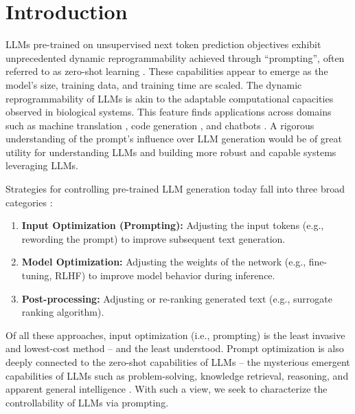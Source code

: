 \documentclass{article} %
\begin{document}
\section{Introduction}
LLMs pre-trained on unsupervised next token prediction objectives exhibit unprecedented dynamic reprogrammability achieved through ``prompting'', often referred to as zero-shot learning \citep{gpt3, wei2022emergent, hagendorff2023machine, noever2023numeracy, openai2023gpt4, GPT3_5_blog}. 
These capabilities appear to emerge as the model's size, training data, and training time are scaled.
The dynamic reprogrammability of LLMs is akin to the adaptable computational capacities observed in biological systems. 
This feature finds applications across domains such as machine translation \citep{wang2023document}, code generation \citep{code_llama}, and chatbots \cite{rlhf_chatbot}. 
A rigorous understanding of the prompt's influence over LLM generation would be of great utility for understanding LLMs and building more robust and capable systems leveraging LLMs. 


Strategies for controlling pre-trained LLM generation today fall into three broad categories \citep{survey_controllable_text_gen}: 
\begin{enumerate}
    \item \textbf{Input Optimization (Prompting): } Adjusting the input tokens (e.g., rewording the prompt) to improve subsequent text generation. 
    \item \textbf{Model Optimization: } Adjusting the weights of the network (e.g., fine-tuning, RLHF) to improve model behavior during inference. 
    \item \textbf{Post-processing: } Adjusting or re-ranking generated text (e.g., surrogate ranking algorithm). 
\end{enumerate}

Of all these approaches, input optimization (i.e., prompting) is the least invasive and lowest-cost method -- and the least understood.
Prompt optimization is also deeply connected to the zero-shot capabilities of LLMs -- the mysterious emergent capabilities of LLMs such as problem-solving, knowledge retrieval, reasoning, and apparent general intelligence \citep{bubeck2023sparks}. With such a view, we seek to characterize the controllability of LLMs via prompting. 


\end{document}
